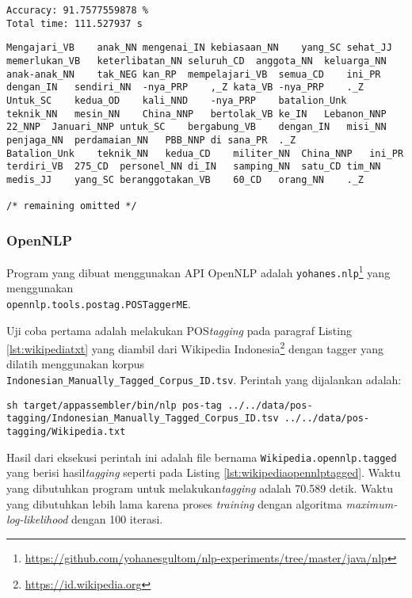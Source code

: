 \documentclass[paper=a4, fontsize=11pt]{scrartcl} %
\numberwithin{equation}{section} %
\numberwithin{figure}{section} %
\numberwithin{table}{section} %
\begin{document}
\begin{lstlisting}
Accuracy: 91.7577559878 %
Total time: 111.527937 s
\end{lstlisting}

\begin{lstlisting}[caption={sentences.tag},label={lst:sentencestagnltk}]
Mengajari_VB	anak_NN	mengenai_IN	kebiasaan_NN	yang_SC	sehat_JJ	memerlukan_VB	keterlibatan_NN	seluruh_CD	anggota_NN	keluarga_NN	anak-anak_NN	tak_NEG	kan_RP	mempelajari_VB	semua_CD	ini_PR	dengan_IN	sendiri_NN	-nya_PRP	,_Z	kata_VB	-nya_PRP	._Z
Untuk_SC	kedua_OD	kali_NND	-nya_PRP	batalion_Unk	teknik_NN	mesin_NN	China_NNP	bertolak_VB	ke_IN	Lebanon_NNP	22_NNP	Januari_NNP	untuk_SC	bergabung_VB	dengan_IN	misi_NN	penjaga_NN	perdamaian_NN	PBB_NNP	di sana_PR	._Z
Batalion_Unk	teknik_NN	kedua_CD	militer_NN	China_NNP	ini_PR	terdiri_VB	275_CD	personel_NN	di_IN	samping_NN	satu_CD	tim_NN	medis_JJ	yang_SC	beranggotakan_VB	60_CD	orang_NN	._Z

/* remaining omitted */
\end{lstlisting}

\subsubsection{OpenNLP}

Program yang dibuat menggunakan API OpenNLP adalah \verb|yohanes.nlp|\footnote{\url{https://github.com/yohanesgultom/nlp-experiments/tree/master/java/nlp}} yang menggunakan\\ \verb|opennlp.tools.postag.POSTaggerME|. 

Uji coba pertama adalah melakukan POS\textit{tagging} pada paragraf Listing \ref{lst:wikipediatxt} yang diambil dari Wikipedia Indonesia\footnote{\url{https://id.wikipedia.org}} dengan tagger yang dilatih menggunakan korpus\\ \verb|Indonesian_Manually_Tagged_Corpus_ID.tsv|. Perintah yang dijalankan adalah:

\begin{lstlisting}
sh target/appassembler/bin/nlp pos-tag ../../data/pos-tagging/Indonesian_Manually_Tagged_Corpus_ID.tsv ../../data/pos-tagging/Wikipedia.txt
\end{lstlisting}

Hasil dari eksekusi perintah ini adalah file bernama \verb|Wikipedia.opennlp.tagged| yang berisi hasil\textit{tagging} seperti pada Listing \ref{lst:wikipediaopennlptagged}. Waktu yang dibutuhkan program untuk melakukan\textit{tagging} adalah 70.589 detik. Waktu yang dibutuhkan lebih lama karena proses \textit{training} dengan algoritma \textit{maximum-log-likelihood} dengan 100 iterasi.
\end{document}
